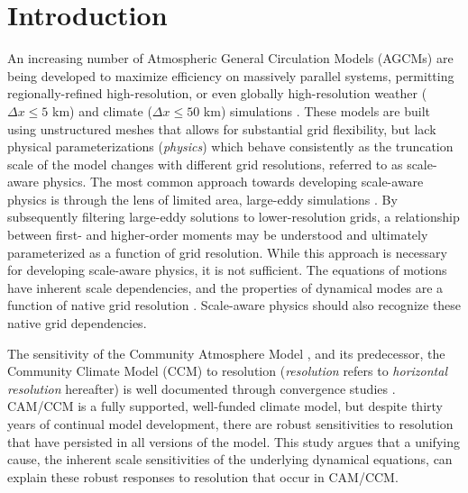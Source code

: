 \documentclass[times]{qjrms4}
\begin{document}

\maketitle

\section{Introduction}

An increasing number of Atmospheric General Circulation Models (AGCMs) are being developed to maximize efficiency on massively parallel systems, permitting regionally-refined high-resolution, or even globally high-resolution weather ($\Delta x \leq 5$ km) and climate ($\Delta x \leq 50$ km) simulations \citep{SMTMN2008JCP,MPASatm,Z2014QJRMS,HETAL2016JCLIM,DCMIP16,LetAl2018JAMES}. These models are built using unstructured meshes that allows for substantial grid flexibility, but lack physical parameterizations ({\em{physics}}) which behave consistently as the truncation scale of the model changes with different grid resolutions, referred to as scale-aware physics. The most common approach towards developing scale-aware physics is through the lens of limited area, large-eddy simulations \citep[e.g.,][]{PC2008JAS,AW2013JAS,SZ2018JCLIM}. By subsequently filtering large-eddy solutions to lower-resolution grids, a relationship between first- and higher-order moments may be understood and ultimately parameterized as a function of grid resolution. While this approach is necessary for developing scale-aware physics, it is not sufficient. The equations of motions have inherent scale dependencies, and the properties of dynamical modes are a function of native grid resolution \citep{O1981JAS,WETAL1997MWR,PG2006JAS,JR2016QJRMS}. Scale-aware physics should also recognize these native grid dependencies.

The sensitivity of the Community Atmosphere Model \citep[CAM;][]{CAM5}, and its predecessor, the Community Climate Model (CCM) to resolution ({\em{resolution}} refers to {\em{horizontal resolution}} hereafter) is well documented through convergence studies \citep{KW1991JGR,WETAL1995CD,W2008TELLUS,RETAL2013JCLIM,ZetAl2014JCb,HR2017JCLIM}. CAM/CCM is a fully supported, well-funded climate model, but despite thirty years of continual model development, there are robust sensitivities to resolution that have persisted in all versions of the model. This study argues that a unifying cause, the inherent scale sensitivities of the underlying dynamical equations, can explain these robust responses to resolution that occur in CAM/CCM.
\end{document}
